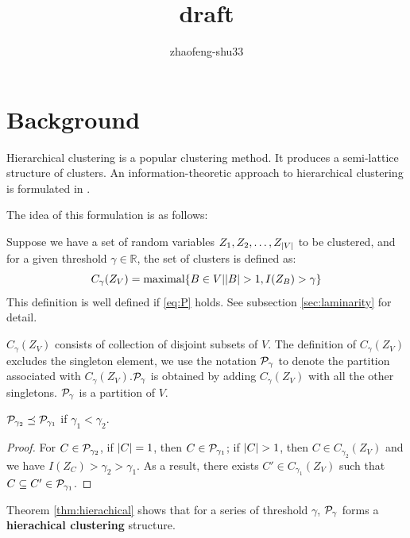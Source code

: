 \documentclass{article}
\begin{document}
\title{draft}
\author{zhaofeng-shu33}
\maketitle
\section{Background}
Hierarchical clustering is a popular clustering method. It produces a semi-lattice structure of clusters. 
An information-theoretic approach to hierarchical clustering is formulated in \cite{ic}.

The idea of this formulation is as follows:

Suppose we have a set of random variables $Z_1, Z_2, \dots, Z_{\abs{V}}$ to be clustered, and for a given threshold $\gamma \in \mathbb{R}$, the set of clusters is defined as:
\begin{equation}\label{eq:def_CgammaZV}
C_{\gamma}(Z_V) = \textrm{maximal}\{ B \in V \vert \abs{B} > 1, I(Z_B) > \gamma \}
\end{equation}
This definition is well defined if \eqref{eq:P} holds. See subsection \ref{sec:laminarity} for detail.

$C_{\gamma}(Z_V)$ consists of collection of disjoint subsets of $V$.
The definition of $C_{\gamma}(Z_V)$ excludes the singleton element,
we use the notation $\P_{\gamma}$ to denote the partition associated with $C_{\gamma}(Z_V)$.$\P_{\gamma}$ is obtained by adding $C_{\gamma}(Z_V)$ with all the other singletons.
$\P_{\gamma}$ is a partition of $V$.

\begin{theorem}\label{thm:hierachical}
$\P_{\gamma_2} \preceq \P_{\gamma_1}$ if $\gamma_1 < \gamma_2$.
\end{theorem}
\begin{proof}
For $C \in \P_{\gamma_2}$, if $\abs{C}=1$, then  $C\in \P_{\gamma_1}$;
if $\abs{C}>1$, then $C \in C_{\gamma_2}(Z_V)$ and we have $I(Z_C) > \gamma_2 > \gamma_1$.
As a result, there exists $C' \in C_{\gamma_1}(Z_V)$ such that $C\subseteq C' \in \P_{\gamma_1}$.
\end{proof}
\begin{remark}
Theorem \ref{thm:hierachical} shows that for a series of threshold $\gamma$, $\P_{\gamma}$ forms a \textbf{hierachical clustering} structure.
\end{remark}
\end{document}
